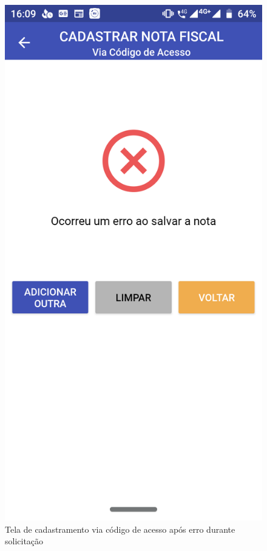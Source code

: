 \newpage
\begin{figure}[h]
    \centering
    \includegraphics[scale=0.15]{tcc/figures/app/app_codigo_acesso_erro_generico.png}
    \caption{Tela de cadastramento via código de acesso após erro durante solicitação}
    \label{appCodigoAcessoErroFig}
\end{figure}

